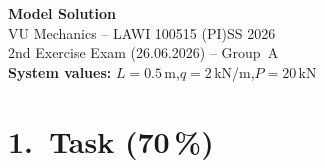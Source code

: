 \documentclass[a4paper,11pt]{article}
\begin{document}

\begin{center}
  {\Large\bfseries Model Solution}\\[4pt]
  {\large VU Mechanics -- LAWI 100515 (PI)\quad SS 2026}\\[2pt]
  {\normalsize 2nd Exercise Exam (26.06.2026) -- Group~A}\\[2pt]
  {\normalsize \textbf{System values:} $L = 0.5$\,m,\quad $q = 2$\,kN/m,\quad $P = 20$\,kN}
\end{center}

\section*{1.~Task \hfill (70\,\%)}
\end{document}
